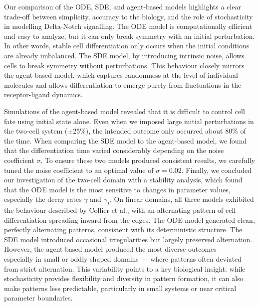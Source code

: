\documentclass{article}
\begin{document}
Our comparison of the ODE, SDE, and agent-based models highlights a clear trade-off between simplicity, accuracy to the biology, and the role of stochasticity in modelling Delta-Notch signalling.
The ODE model is computationally efficient and easy to analyze, but it can only break symmetry with an initial perturbation.
In other words, stable cell differentiation only occurs when the initial conditions are already imbalanced.
The SDE model, by introducing intrinsic noise, allows cells to break symmetry without perturbations.
This behaviour closely mirrors the agent-based model, which captures randomness at the level of individual molecules and allows differentiation to emerge purely from fluctuations in the receptor-ligand dynamics.

Simulations of the agent-based model revealed that it is difficult to control cell fate using initial state alone.
Even when we imposed large initial perturbations in the two-cell system ($\pm 25\%$), the intended outcome only occurred about $80\%$ of the time.
When comparing the SDE model to the agent-based model, we found that the differentiation time varied considerably depending on the noise coefficient $\sigma$.
To ensure these two models produced consistent results, we carefully tuned the noise coefficient to an optimal value of $\sigma = 0.02$.
Finally, we concluded our investigation of the two-cell domain with a stability analysis, which found that the ODE model is the most sensitive to changes in parameter values, especially the decay rates $\gamma$ and $\gamma_{I}$.
On linear domains, all three models exhibited the behaviour described by Collier et al., with an alternating pattern of cell differentiation spreading inward from the edges.
The ODE model generated clean, perfectly alternating patterns, consistent with its deterministic structure.
The SDE model introduced occasional irregularities but largely preserved alternation.
However, the agent-based model produced the most diverse outcomes — especially in small or oddly shaped domains — where patterns often deviated from strict alternation.
This variability points to a key biological insight: while stochasticity provides flexibility and diversity in pattern formation, it can also make patterns less predictable, particularly in small systems or near critical parameter boundaries.

\nocite{*}
\printbibliography

\appendix
\end{document}
